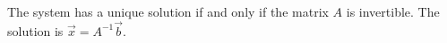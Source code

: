 The system has a unique solution if and only if the matrix $A$ is invertible.  The
solution is $\vec{x} = A^{-1} \vec{b}$.

%
%
%
%
%
%
